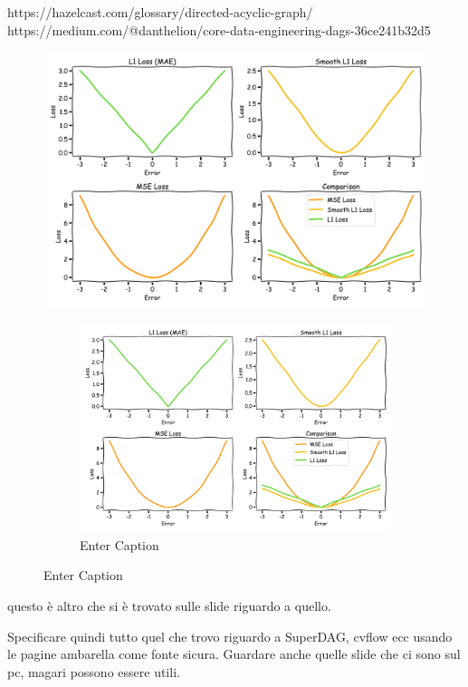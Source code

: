 https://hazelcast.com/glossary/directed-acyclic-graph/
https://medium.com/@danthelion/core-data-engineering-dags-36ce241b32d5
\begin{figure}
    \centering
    \includegraphics[width=1\linewidth]{LateX//figs/loss_functions_xkcd.pdf}
    \caption{Enter Caption}
\begin{figure}
        \centering
        \includegraphics[width=1\linewidth]{LateX//figs/loss_functions_xkcd.pdf}
        \caption{Enter Caption}
        \label{fig:enter-label}
    \end{figure}
        \label{fig:enter-label}
\end{figure}
questo è altro che si è trovato sulle slide riguardo a quello. 

Specificare quindi tutto quel che trovo riguardo a SuperDAG, cvflow ecc usando le pagine ambarella come fonte sicura. Guardare anche quelle slide che ci sono sul pc, magari possono essere utili. 

